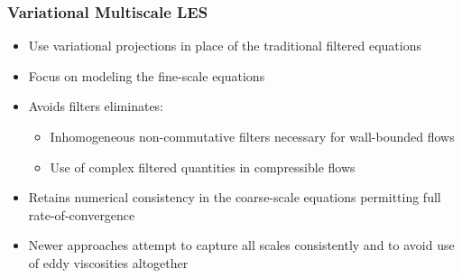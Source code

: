 \documentclass{beamer}
\begin{document}
\begin{frame}\frametitle{Variational Multiscale LES}
\begin{itemize}
\item Use variational projections in place of the traditional filtered
equations
\item Focus on modeling the fine-scale equations
\item Avoids filters eliminates:
\begin{itemize}
\item Inhomogeneous non-commutative filters necessary for wall-bounded flows
\item Use of complex filtered quantities in compressible flows
\end{itemize}
\item Retains numerical consistency in the coarse-scale equations permitting
full rate-of-convergence
\item Newer approaches attempt to capture all scales consistently and to avoid use of eddy
viscosities altogether
\end{itemize}
\end{frame}
\end{document}
